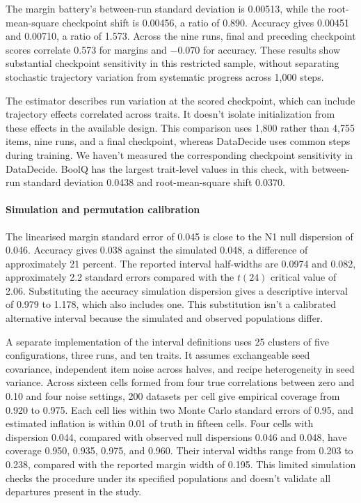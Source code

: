 The margin battery's between-run standard deviation is 0.00513, while the root-mean-square checkpoint shift is 0.00456, a ratio of 0.890. Accuracy gives 0.00451 and 0.00710, a ratio of 1.573. Across the nine runs, final and preceding checkpoint scores correlate 0.573 for margins and $-0.070$ for accuracy. These results show substantial checkpoint sensitivity in this restricted sample, without separating stochastic trajectory variation from systematic progress across 1,000 steps.

The estimator describes run variation at the scored checkpoint, which can include trajectory effects correlated across traits. It doesn't isolate initialization from these effects in the available design. This comparison uses 1,800 rather than 4,755 items, nine runs, and a final checkpoint, whereas DataDecide uses common steps during training. We haven't measured the corresponding checkpoint sensitivity in DataDecide. BoolQ has the largest trait-level values in this check, with between-run standard deviation 0.0438 and root-mean-square shift 0.0370.

\paragraph{Simulation and permutation calibration}
The linearised margin standard error of 0.045 is close to the N1 null dispersion of 0.046. Accuracy gives 0.038 against the simulated 0.048, a difference of approximately 21 percent. The reported interval half-widths are 0.0974 and 0.082, approximately 2.2 standard errors compared with the $t(24)$ critical value of 2.06. Substituting the accuracy simulation dispersion gives a descriptive interval of 0.979 to 1.178, which also includes one. This substitution isn't a calibrated alternative interval because the simulated and observed populations differ.

A separate implementation of the interval definitions uses 25 clusters of five configurations, three runs, and ten traits. It assumes exchangeable seed covariance, independent item noise across halves, and recipe heterogeneity in seed variance. Across sixteen cells formed from four true correlations between zero and 0.10 and four noise settings, 200 datasets per cell give empirical coverage from 0.920 to 0.975. Each cell lies within two Monte Carlo standard errors of 0.95, and estimated inflation is within 0.01 of truth in fifteen cells. Four cells with dispersion 0.044, compared with observed null dispersions 0.046 and 0.048, have coverage 0.950, 0.935, 0.975, and 0.960. Their interval widths range from 0.203 to 0.238, compared with the reported margin width of 0.195. This limited simulation checks the procedure under its specified populations and doesn't validate all departures present in the study.

